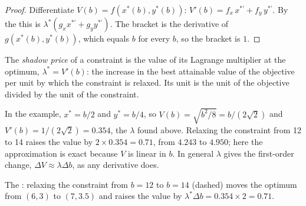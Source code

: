 \begin{proof}
Differentiate $V(b) = f(x^*(b), y^*(b))$:
$V'(b) = f_x \,x^{*\prime} + f_y \,y^{*\prime}$. By the 
this is $\lambda^*(g_x x^{*\prime} + g_y y^{*\prime})$. The bracket is the
derivative of $g(x^*(b), y^*(b))$, which equals $b$ for every $b$, so the
bracket is $1$.
\end{proof}

\begin{definition}\label{def:b1:constrained-optimisation:shadow-price}
The \emph{shadow price} of a constraint is the value of its Lagrange
multiplier at the optimum, $\lambda^* = V'(b)$: the increase in the best
attainable value of the objective per unit by which the constraint is
relaxed. Its unit is the unit of the objective divided by the unit of the
constraint.
\end{definition}

In the example, $x^* = b/2$ and $y^* = b/4$, so
$V(b) = \sqrt{b^2/8} = b/(2\sqrt2)$ and $V'(b) = 1/(2\sqrt 2) = 0.354$, the
$\lambda$ found above. Relaxing the constraint from 12 to 14 raises the
value by $2 \times 0.354 = 0.71$, from $4.243$ to $4.950$; here the
approximation is exact because $V$ is linear in $b$. In general $\lambda$
gives the first-order change, $\Delta V \approx \lambda \Delta b$, as any
derivative does.

\begin{omfigure}

{\small The : relaxing the constraint from $b = 12$ to $b = 14$
(dashed) moves the optimum from $(6, 3)$ to $(7, 3.5)$ and raises the value by
$\lambda^* \Delta b = 0.354 \times 2 = 0.71$.}
\end{omfigure}

